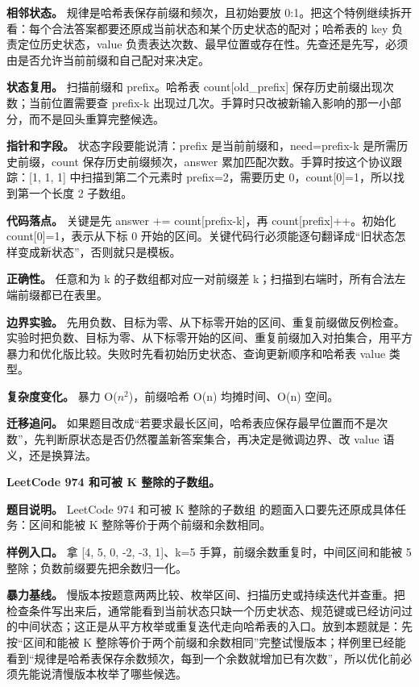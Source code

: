 \textbf{相邻状态。} 规律是哈希表保存前缀和频次，且初始要放 0:1。把这个特例继续拆开看：每个合法答案都要还原成当前状态和某个历史状态的配对；哈希表的 key 负责定位历史状态，value 负责表达次数、最早位置或存在性。先查还是先写，必须由是否允许当前前缀和自己配对来决定。

\textbf{状态复用。} 扫描前缀和 prefix。哈希表 count[old\_prefix] 保存历史前缀出现次数；当前位置需要查 prefix-k 出现过几次。手算时只改被新输入影响的那一小部分，而不是回头重算完整候选。

\textbf{指针和字段。} 状态字段要能说清：prefix 是当前前缀和，need=prefix-k 是所需历史前缀，count 保存历史前缀频次，answer 累加匹配次数。手算时按这个协议跟踪：[1, 1, 1] 中扫描到第二个元素时 prefix=2，需要历史 0，count[0]=1，所以找到第一个长度 2 子数组。

\textbf{代码落点。} 关键是先 answer += count[prefix-k]，再 count[prefix]++。初始化 count[0]=1，表示从下标 0 开始的区间。关键代码行必须能逐句翻译成“旧状态怎样变成新状态”，否则就只是模板。

\textbf{正确性。} 任意和为 k 的子数组都对应一对前缀差 k；扫描到右端时，所有合法左端前缀都已在表里。

\textbf{边界实验。} 先用负数、目标为零、从下标零开始的区间、重复前缀做反例检查。实验时把负数、目标为零、从下标零开始的区间、重复前缀加入对拍集合，用平方暴力和优化版比较。失败时先看初始历史状态、查询更新顺序和哈希表 value 类型。

\textbf{复杂度变化。} 暴力 O(\ensuremath{n^{2}})，前缀哈希 O(n) 均摊时间、O(n) 空间。

\textbf{迁移追问。} 如果题目改成“若要求最长区间，哈希表应保存最早位置而不是次数”，先判断原状态是否仍然覆盖新答案集合，再决定是微调边界、改 value 语义，还是换算法。

\noindent\textbf{LeetCode 974 和可被 K 整除的子数组。}

\textbf{题目说明。} LeetCode 974 和可被 K 整除的子数组 的题面入口要先还原成具体任务：区间和能被 K 整除等价于两个前缀和余数相同。

\textbf{样例入口。} 拿 [4, 5, 0, -2, -3, 1]、k=5 手算，前缀余数重复时，中间区间和能被 5 整除；负数前缀要先把余数归一化。

\textbf{暴力基线。} 慢版本按题意两两比较、枚举区间、扫描历史或持续迭代并查重。把检查条件写出来后，通常能看到当前状态只缺一个历史状态、规范键或已经访问过的中间状态；这正是从平方枚举或重复迭代走向哈希表的入口。放到本题就是：先按“区间和能被 K 整除等价于两个前缀和余数相同”完整试慢版本；样例里已经能看到“规律是哈希表保存余数频次，每到一个余数就增加已有次数”，所以优化前必须先能说清慢版本枚举了哪些候选。

